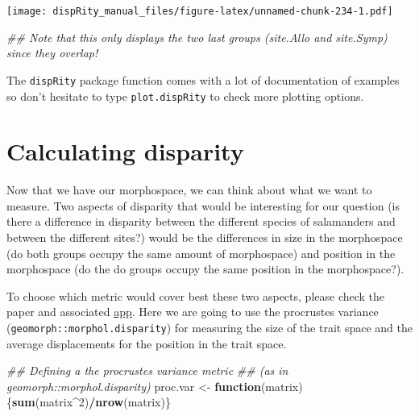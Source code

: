 \documentclass[
]{book}
\newenvironment{Shaded}{\begin{snugshade}}{\end{snugshade}}
\newcommand{\CommentTok}[1]{\textcolor[rgb]{0.56,0.35,0.01}{\textit{#1}}}
\newcommand{\ControlFlowTok}[1]{\textcolor[rgb]{0.13,0.29,0.53}{\textbf{#1}}}
\newcommand{\DecValTok}[1]{\textcolor[rgb]{0.00,0.00,0.81}{#1}}
\newcommand{\KeywordTok}[1]{\textcolor[rgb]{0.13,0.29,0.53}{\textbf{#1}}}
\newcommand{\NormalTok}[1]{#1}
\newcommand{\OperatorTok}[1]{\textcolor[rgb]{0.81,0.36,0.00}{\textbf{#1}}}
\newcommand{\StringTok}[1]{\textcolor[rgb]{0.31,0.60,0.02}{#1}}
\begin{document}
\texttt{[image: dispRity\_manual\_files/figure-latex/unnamed-chunk-234-1.pdf]}

\begin{Shaded}
\begin{Highlighting}[]
\CommentTok{\#\# Note that this only displays the two last groups (site.Allo and site.Symp) since they overlap!}
\end{Highlighting}
\end{Shaded}

The \texttt{dispRity} package function comes with a lot of documentation of examples so don't hesitate to type \texttt{plot.dispRity} to check more plotting options.

\hypertarget{calculating-disparity-2}{%
\section{Calculating disparity}\label{calculating-disparity-2}}

Now that we have our morphospace, we can think about what we want to measure.
Two aspects of disparity that would be interesting for our question (is there a difference in disparity between the different species of salamanders and between the different sites?) would be the differences in size in the morphospace (do both groups occupy the same amount of morphospace) and position in the morphospace (do the do groups occupy the same position in the morphospace?).

To choose which metric would cover best these two aspects, please check the \citet{moms} paper and associated \href{https://tguillerme.shinyapps.io/moms/}{app}. Here we are going to use the procrustes variance (\texttt{geomorph::morphol.disparity}) for measuring the size of the trait space and the average displacements \citep{moms} for the position in the trait space.

\begin{Shaded}
\begin{Highlighting}[]
\CommentTok{\#\# Defining a the procrustes variance metric}
\CommentTok{\#\# (as in geomorph::morphol.disparity)}
\NormalTok{proc.var \textless{}{-}}\StringTok{ }\ControlFlowTok{function}\NormalTok{(matrix) \{}\KeywordTok{sum}\NormalTok{(matrix}\OperatorTok{\^{}}\DecValTok{2}\NormalTok{)}\OperatorTok{/}\KeywordTok{nrow}\NormalTok{(matrix)\}}
\end{Highlighting}
\end{Shaded}
\end{document}
